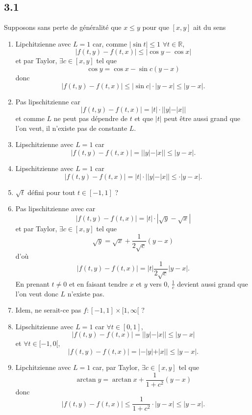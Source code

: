 \documentclass{article}
\begin{document}
\subsection*{3.1}
Supposons sans perte de généralité que $x \leq y$ pour que $[x,y]$ ait du sens
\begin{enumerate}
  \item Lipchitzienne avec $L = 1$ car, comme
    $|\sin t| \leq 1$ $\forall t \in \mathbb{R}$,
    \[ |f(t,y) - f(t,x)| \leq |\cos y - \cos x| \]
    et par Taylor, $\exists c \in [x,y]$ tel que
    \[ \cos y = \cos x - \sin c (y - x) \]
    donc
    \[ |f(t,y) - f(t,x)| \leq |\sin c| \cdot |y - x| \leq |y - x|. \]
  \item Pas lipschitzienne car
    \[ |f(t,y) - f(t,x)| = |t|\cdot||y| - |x|| \]
    et comme $L$ ne peut pas dépendre de $t$ et que $|t|$ peut être aussi
    grand que l'on veut, il n'existe pas de constante $L$.
  \item Lipschitzienne avec $L = 1$ car
    \[ |f(t,y) - f(t,x)| = ||y| - |x|| \leq |y - x|. \]
  \item Lipschitzienne avec $L = 1$ car
    \[ |f(t,y) - f(t,x)| = |t|\cdot||y| - |x|| \leq \cdot |y - x|. \]
  \item $\sqrt{t}$ défini pour tout $t \in [-1,1]$ ?
  \item Pas lipschitzienne avec car
    \[ |f(t,y) - f(t,x)| = |t|\cdot|\sqrt{y} - \sqrt{x}| \]
    et par Taylor, $\exists c \in [x,y]$ tel que
    \[ \sqrt{y} = \sqrt{x} + \frac{1}{2\sqrt{c}}(y-x) \]
    d'où
    \[ |f(t,y) - f(t,x)| = |t|\frac{1}{2\sqrt{c}}|y-x|. \]
    En prenant $t \neq 0$ et en faisant tendre $x$ et $y$ vers 0,
    $\frac{1}{c}$ devient aussi grand que l'on veut donc $L$ n'existe pas.
  \item Idem, ne serait-ce pas $f:[-1,1]\times[1,\infty[$ ?
  \item Lipschitzienne avec $L = 1$ car $\forall t \in [0,1]$,
    \[ |f(t,y) - f(t,x)| = ||y| - |x|| \leq |y - x| \]
    et $\forall t \in [-1,0[$,
    \[ |f(t,y) - f(t,x)| = |-|y| + |x|| \leq |y - x|. \]
  \item Lipchitzienne avec $L = 1$ car, par Taylor,
    $\exists c \in [x,y]$ tel que
    \[ \arctan y = \arctan x + \frac{1}{1+c^2} (y - x) \]
    donc
    \[ |f(t,y) - f(t,x)| \leq \frac{1}{1+c^2} \cdot |y - x| \leq |y - x|. \]
\end{enumerate}
\end{document}
